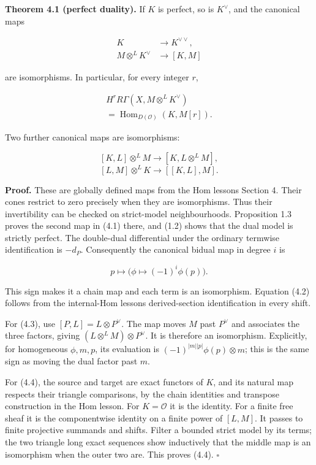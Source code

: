 \documentclass[
  english,
  11pt,
  a4paper,
]{article}
\begin{document}
\textbf{Theorem 4.1 (perfect duality).} If \(K\) is perfect, so is
\(K^\vee\), and the canonical maps

\[\begin{aligned}
K&\longrightarrow K^{\vee\vee},\\
M\otimes^L K^\vee&\longrightarrow[K,M]
\end{aligned}
\tag{4.1}\]

are isomorphisms. In particular, for every integer \(r\),

\[\begin{gathered}
H^rR\Gamma(X,M\otimes^L K^\vee)\\
=\operatorname{Hom}_{D(\mathcal O)}(K,M[r]).
\end{gathered}
\tag{4.2}\]

Two further canonical maps are isomorphisms:

\[{}[K,L]\otimes^L M\longrightarrow[K,L\otimes^L M],
\tag{4.3}\] \[{}[L,M]\otimes^L K\longrightarrow[[K,L],M].
\tag{4.4}\]

\textbf{Proof.} These are globally defined maps from the Hom
lesson\textquotesingle s Section 4. Their cones restrict to zero
precisely when they are isomorphisms. Thus their invertibility can be
checked on strict-model neighbourhoods. Proposition 1.3 proves the
second map in (4.1) there, and (1.2) shows that the dual model is
strictly perfect. The double-dual differential under the ordinary
termwise identification is \(-d_P\). Consequently the canonical bidual
map in degree \(i\) is

\[p\longmapsto\bigl(\phi\mapsto(-1)^i\phi(p)\bigr).
\tag{4.5}\]

This sign makes it a chain map and each term is an isomorphism. Equation
(4.2) follows from the internal-Hom lesson\textquotesingle s
derived-section identification in every shift.

For (4.3), use \([P,L]=L\otimes P^\vee\). The map moves \(M\) past
\(P^\vee\) and associates the three factors, giving
\((L\otimes^L M)\otimes P^\vee\). It is therefore an isomorphism.
Explicitly, for homogeneous \(\phi,m,p\), its evaluation is
\((-1)^{|m||p|}\phi(p)\otimes m\); this is the same sign as moving the
dual factor past \(m\).

For (4.4), the source and target are exact functors of \(K\), and its
natural map respects their triangle comparisons, by the chain identities
and transpose construction in the Hom lesson. For \(K=\mathcal O\) it is
the identity. For a finite free sheaf it is the componentwise identity
on a finite power of \([L,M]\). It passes to finite projective summands
and shifts. Filter a bounded strict model by its terms; the two triangle
long exact sequences show inductively that the middle map is an
isomorphism when the outer two are. This proves (4.4). \(\square\)
\end{document}
